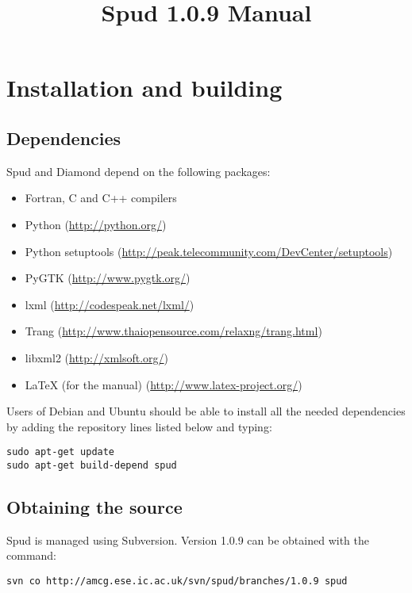 \documentclass[a4paper, 11pt]{book}
\title{Spud 1.0.9 Manual}
\begin{document}
\maketitle

\tableofcontents


\chapter{Installation and building}

\section{Dependencies}

Spud and Diamond depend on the following packages:

\begin{itemize}
\item Fortran, C and C++ compilers
\item Python (\url{http://python.org/})
\item Python setuptools (\url{http://peak.telecommunity.com/DevCenter/setuptools})
\item PyGTK (\url{http://www.pygtk.org/})
\item lxml (\url{http://codespeak.net/lxml/})
\item Trang (\url{http://www.thaiopensource.com/relaxng/trang.html})
\item libxml2 (\url{http://xmlsoft.org/})
\item LaTeX (for the manual) (\url{http://www.latex-project.org/})
\end{itemize}

Users of Debian and Ubuntu should
be able to install all the needed dependencies by adding the repository
lines listed below and typing:

\begin{verbatim}
sudo apt-get update
sudo apt-get build-depend spud
\end{verbatim}

\section{Obtaining the source}

Spud is managed using Subversion. Version 1.0.9 can be obtained with the
command:

\begin{verbatim}
svn co http://amcg.ese.ic.ac.uk/svn/spud/branches/1.0.9 spud
\end{verbatim}
\end{document}
